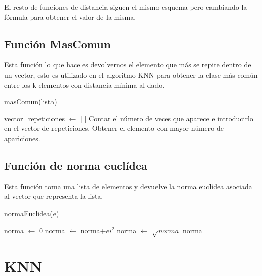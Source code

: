 \documentclass[12pt,a4paper]{article}
\begin{document}
	El resto de funciones de distancia siguen el mismo esquema pero cambiando la fórmula para obtener el valor de la misma.
	
	\subsection{Función MasComun}
	
	Esta función lo que hace es devolvernos el elemento que más se repite dentro de un vector, esto es utilizado en el algoritmo KNN para obtener la clase más común entre los k elementos con distancia mínima al dado.
	
	\begin{algorithm}
		\caption{masComun(lista)}
		\begin{algorithmic}
			\STATE vector\_repeticiones $\leftarrow$ [ ]
				\STATE Contar el número de veces que aparece e introducirlo en el vector de repeticiones.
			\ENDFOR
			\STATE Obtener el elemento con mayor número de apariciones.
		\end{algorithmic}
	\end{algorithm}
	
	\subsection{Función de norma euclídea}
	
	Esta función toma una lista de elementos y devuelve la norma euclídea asociada al vector que representa la lista.
	
	\begin{algorithm}
		\caption{normaEuclidea(e)}
		\begin{algorithmic}
			\STATE norma $\leftarrow$ 0
			\FOR{ei en e}
				\STATE norma $\leftarrow$ norma+$ei^2$
			\ENDFOR
			\STATE norma $\leftarrow$ $\sqrt{norma}$
			\RETURN norma
		\end{algorithmic}
	\end{algorithm}


	\section{KNN}
	\label{sec:knn}
\end{document}
